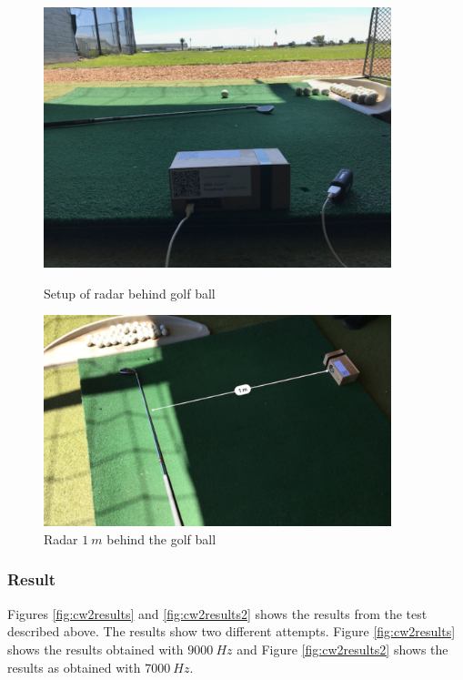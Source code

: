 \begin{figure}[h!]
    \centering
    \begin{minipage}{0.45\textwidth}
        \centering
        \includegraphics[width = 0.9\textwidth]{images/golfball.pdf}
    \caption{Setup of radar behind golf ball}\label{fig:golfball}
    \end{minipage}\hfill
    \begin{minipage}{0.45\textwidth}
        \centering
        \includegraphics[width=0.9\textwidth]{images/measuregolf.pdf}
        \caption{Radar $1\ m$ behind the golf ball}\label{fig:measuregolf}
    \end{minipage}
\end{figure}

\subsubsection{Result}
Figures \ref{fig:cw2results} and \ref{fig:cw2results2} shows the results from the test described above. The results show two different attempts. Figure \ref{fig:cw2results} shows the results obtained with $9000\ Hz$ and Figure \ref{fig:cw2results2} shows the results as obtained with $7000\ Hz$.

